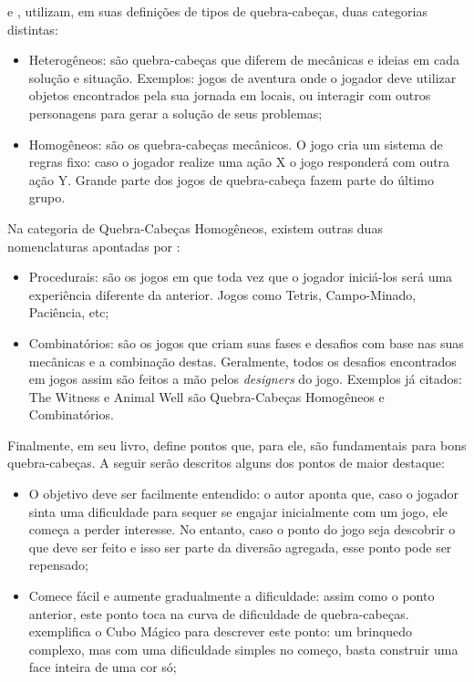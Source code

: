  e , utilizam, em suas definições de tipos de quebra-cabeças, duas categorias distintas:
\begin{itemize}
	\item Heterogêneos: são quebra-cabeças que diferem de mecânicas e ideias em cada solução e situação. Exemplos: jogos de aventura onde o jogador deve utilizar objetos encontrados pela sua jornada em locais, ou interagir com outros personagens para gerar a solução de seus problemas;
	\item Homogêneos: são os quebra-cabeças mecânicos. O jogo cria um sistema de regras fixo: caso o jogador realize uma ação X o jogo responderá com outra ação Y. Grande parte dos jogos de quebra-cabeça fazem parte do último grupo.
\end{itemize}

Na categoria de Quebra-Cabeças Homogêneos, existem outras duas nomenclaturas apontadas por :
\begin{itemize}
	\item Procedurais: são os jogos em que toda vez que o jogador iniciá-los será uma experiência diferente da anterior. Jogos como Tetris, Campo-Minado, Paciência, etc;
	\item Combinatórios: são os jogos que criam suas fases e desafios com base nas suas mecânicas e a combinação destas. Geralmente, todos os desafios encontrados em jogos assim são feitos a mão pelos \textit{designers} do jogo. Exemplos já citados: The Witness e Animal Well são Quebra-Cabeças Homogêneos e Combinatórios.
\end{itemize}

Finalmente,  em seu livro, define pontos que, para ele, são fundamentais para bons quebra-cabeças. A seguir serão descritos alguns dos pontos de maior destaque:

\begin{itemize}
    \item O objetivo deve ser facilmente entendido: o autor aponta que, caso o jogador sinta uma dificuldade para sequer se engajar inicialmente com um jogo, ele começa a perder interesse. No entanto, caso o ponto do jogo seja descobrir o que deve ser feito e isso ser parte da diversão agregada, esse ponto pode ser repensado;
    \item Comece fácil e aumente gradualmente a dificuldade: assim como o ponto anterior, este ponto toca na curva de dificuldade de quebra-cabeças. \citeauthor{Schell2008} exemplifica o Cubo Mágico para descrever este ponto: um brinquedo complexo, mas com uma dificuldade simples no começo, basta construir uma face inteira de uma cor só;
\end{itemize}

